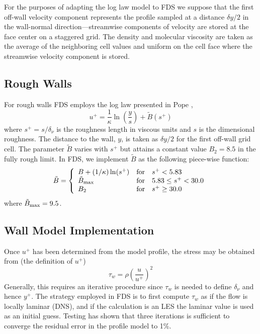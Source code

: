 For the purposes of adapting the log law model to FDS we suppose that the first off-wall velocity component represents the profile sampled at a distance $\delta y/2$ in the wall-normal direction---streamwise components of velocity are stored at the face center on a staggered grid.  The density and molecular viscosity are taken as the average of the neighboring cell values and uniform on the cell face where the streamwise velocity component is stored.

\subsection{Rough Walls}
\label{rough_wall_model}

For rough walls FDS employs the log law presented in Pope \cite{Pope:2000},
\begin{equation}
\label{eqn_roughwallloglaw}
u^+ = \frac{1}{\kappa} \ln \left(\frac{y}{s}\right) + \tilde{B}(s^+)
\end{equation}
where $s^+ = s/\delta_\nu$ is the roughness length in viscous units and $s$ is the dimensional roughness. The distance to the wall, $y$, is taken as $\delta y/2$ for the first off-wall grid cell.  The parameter $\tilde{B}$ varies with $s^+$ but attains a constant value $B_2=8.5$ in the fully rough limit.  In FDS, we implement $\tilde{B}$ as the following piece-wise function:
\begin{equation}
\tilde{B} = \left\{ \begin{array}{lll} B + (1/\kappa)\ln(s^+)  & \mbox{for} &          s^+ < 5.83 \\
                                       \tilde{B}_{\rm max}     & \mbox{for} & 5.83 \le s^+ < 30.0 \\
                                       B_2                     & \mbox{for} &          s^+ \ge 30.0 \end{array} \right.
\end{equation}
where $\tilde{B}_{\rm max} = 9.5$.

\subsection{Wall Model Implementation}
Once $u^+$ has been determined from the model profile, the stress may be obtained from (the definition of $u^+$)
\begin{equation}
\label{eqn_wall_stress}
\tau_w = \rho \left( \frac{u}{u^+} \right)^2
\end{equation}
Generally, this requires an iterative procedure since $\tau_w$ is needed to define $\delta_\nu$ and hence $y^+$.  The strategy employed in FDS is to first compute $\tau_w$ as if the flow is locally laminar (DNS), and if the calculation is an LES the laminar value is used as an initial guess.  Testing has shown that three iterations is sufficient to converge the residual error in the profile model to 1\%.

